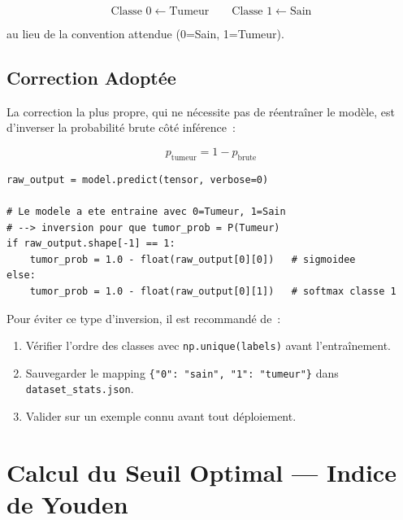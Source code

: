 \documentclass[12pt, a4paper]{report}
\newcommand{\code}[1]{\texttt{\small #1}}
\newcommand{\fichier}[1]{\texttt{\small\color{blue!70!black}#1}}
\begin{document}
\begin{equation}
  \text{Classe~0} \leftarrow \text{Tumeur} \qquad
  \text{Classe~1} \leftarrow \text{Sain}
\end{equation}

au lieu de la convention attendue (0=Sain, 1=Tumeur).

\subsection{Correction Adoptée}

La correction la plus propre, qui ne nécessite pas de réentraîner
le modèle, est d'inverser la probabilité brute côté inférence~:

\begin{equation}
  \label{eq:inversion}
  \boxed{p_{\text{tumeur}} = 1 - p_{\text{brute}}}
\end{equation}

\begin{lstlisting}[caption={Inversion dans views.py (detector/views.py)},
                   label={lst:inversion}]
raw_output = model.predict(tensor, verbose=0)

# Le modele a ete entraine avec 0=Tumeur, 1=Sain
# --> inversion pour que tumor_prob = P(Tumeur)
if raw_output.shape[-1] == 1:
    tumor_prob = 1.0 - float(raw_output[0][0])   # sigmoidee
else:
    tumor_prob = 1.0 - float(raw_output[0][1])   # softmax classe 1
\end{lstlisting}

\begin{warnbox}
  Pour éviter ce type d'inversion, il est recommandé de~:
  \begin{enumerate}
    \item Vérifier l'ordre des classes avec \code{np.unique(labels)}
          avant l'entraînement.
    \item Sauvegarder le mapping \code{\{"0": "sain", "1": "tumeur"\}}
          dans \fichier{dataset\_stats.json}.
    \item Valider sur un exemple connu avant tout déploiement.
  \end{enumerate}
\end{warnbox}

\section{Calcul du Seuil Optimal — Indice de Youden}
\label{sec:youden}
\end{document}
